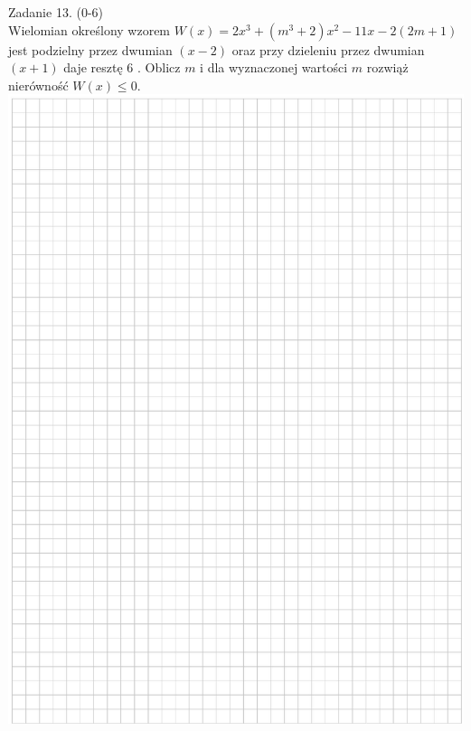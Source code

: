 \documentclass[10pt]{article}
\begin{document}
Zadanie 13. (0-6)\\
Wielomian określony wzorem \(W(x)=2 x^{3}+\left(m^{3}+2\right) x^{2}-11 x-2(2 m+1)\) jest podzielny przez dwumian \((x-2)\) oraz przy dzieleniu przez dwumian \((x+1)\) daje resztę 6 . Oblicz \(m\) i dla wyznaczonej wartości \(m\) rozwiąż nierówność \(W(x) \leq 0\).\\
\includegraphics[max width=\textwidth, center]{2024_11_21_9df891ea1c7ef9791261g-16}\\
\end{document}

